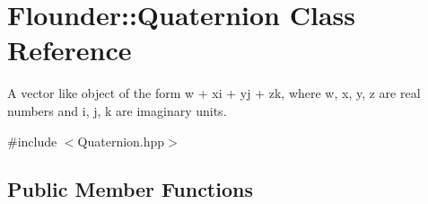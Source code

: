 \hypertarget{class_flounder_1_1_quaternion}{}\section{Flounder\+:\+:Quaternion Class Reference}
\label{class_flounder_1_1_quaternion}


A vector like object of the form w + xi + yj + zk, where w, x, y, z are real numbers and i, j, k are imaginary units.  




{\ttfamily \#include $<$Quaternion.\+hpp$>$}

\subsection*{Public Member Functions}
